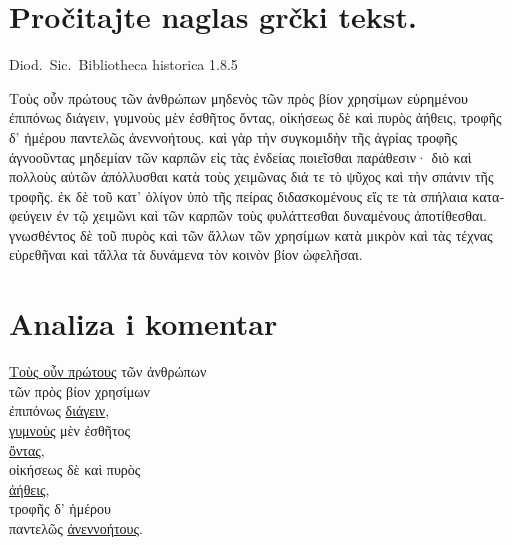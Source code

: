 
\section*{Pročitajte naglas grčki tekst.}

Diod.\ Sic.\ Bibliotheca historica 1.8.5


\medskip

\begin{greek}
{\large
{ \noindent Τοὺς οὖν πρώτους τῶν ἀνθρώπων μηδενὸς τῶν πρὸς βίον χρησίμων εὑρημένου ἐπιπόνως διάγειν, γυμνοὺς μὲν ἐσθῆτος ὄντας, οἰκήσεως δὲ καὶ πυρὸς ἀήθεις, τροφῆς δ' ἡμέρου παντελῶς ἀνεννοήτους. καὶ γὰρ τὴν συγκομιδὴν τῆς ἀγρίας τροφῆς ἀγνοοῦντας μηδεμίαν τῶν καρπῶν εἰς τὰς ἐνδείας ποιεῖσθαι παράθεσιν· διὸ καὶ πολλοὺς αὐτῶν ἀπόλλυσθαι κατὰ τοὺς χειμῶνας διά τε τὸ ψῦχος καὶ τὴν σπάνιν τῆς τροφῆς. ἐκ δὲ τοῦ κατ' ὀλίγον ὑπὸ τῆς πείρας διδασκομένους εἴς τε τὰ σπήλαια καταφεύγειν ἐν τῷ χειμῶνι καὶ τῶν καρπῶν τοὺς φυλάττεσθαι δυναμένους ἀποτίθεσθαι. γνωσθέντος δὲ τοῦ πυρὸς καὶ τῶν ἄλλων τῶν χρησίμων κατὰ μικρὸν καὶ τὰς τέχνας εὑρεθῆναι καὶ τἄλλα τὰ δυνάμενα τὸν κοινὸν βίον ὠφελῆσαι.

}
}
\end{greek}

\section*{Analiza i komentar}


{\large
\begin{greek}
\noindent \underline{Τοὺς οὖν πρώτους} τῶν ἀνθρώπων \\
 τῶν πρὸς βίον χρησίμων  \\
ἐπιπόνως \underline{διάγειν},  \\
\underline{γυμνοὺς} μὲν ἐσθῆτος\\
\tabto{2em} \underline{ὄντας}, \\
οἰκήσεως δὲ καὶ πυρὸς\\
\tabto{2em}  \underline{ἀήθεις}, \\
τροφῆς δ' ἡμέρου \\
\tabto{2em} παντελῶς \underline{ἀνεννοήτους}.\\

\end{greek}
}

